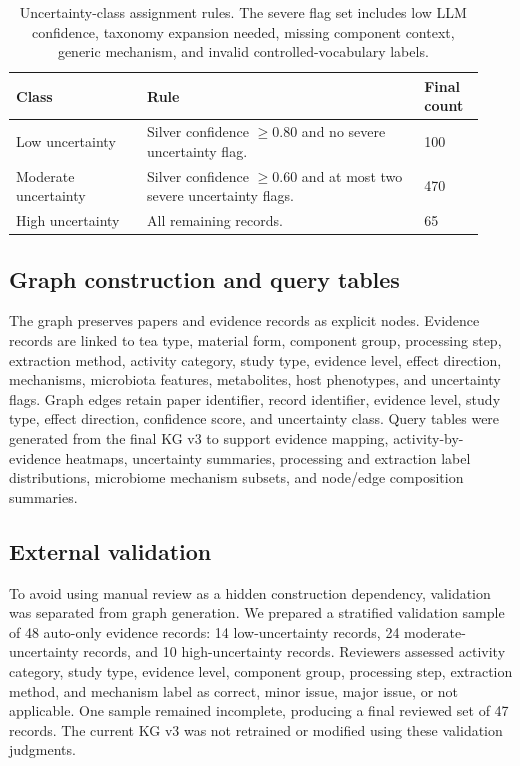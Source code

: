 \documentclass[11pt]{article}
\begin{document}
\begin{table}[t]
\centering
\small
\caption{Uncertainty-class assignment rules. The severe flag set includes low LLM confidence, taxonomy expansion needed, missing component context, generic mechanism, and invalid controlled-vocabulary labels.}
\label{tab:uncertainty_classes}
\begin{tabular}{p{0.26\linewidth}p{0.55\linewidth}p{0.12\linewidth}}
\toprule
Class & Rule & Final count \\
\midrule
Low uncertainty & Silver confidence $\geq 0.80$ and no severe uncertainty flag. & 100 \\
Moderate uncertainty & Silver confidence $\geq 0.60$ and at most two severe uncertainty flags. & 470 \\
High uncertainty & All remaining records. & 65 \\
\bottomrule
\end{tabular}
\end{table}

\subsection{Graph construction and query tables}

The graph preserves papers and evidence records as explicit nodes. Evidence records are linked to tea type, material form, component group, processing step, extraction method, activity category, study type, evidence level, effect direction, mechanisms, microbiota features, metabolites, host phenotypes, and uncertainty flags. Graph edges retain paper identifier, record identifier, evidence level, study type, effect direction, confidence score, and uncertainty class. Query tables were generated from the final KG v3 to support evidence mapping, activity-by-evidence heatmaps, uncertainty summaries, processing and extraction label distributions, microbiome mechanism subsets, and node/edge composition summaries.

\subsection{External validation}

To avoid using manual review as a hidden construction dependency, validation was separated from graph generation. We prepared a stratified validation sample of 48 auto-only evidence records: 14 low-uncertainty records, 24 moderate-uncertainty records, and 10 high-uncertainty records. Reviewers assessed activity category, study type, evidence level, component group, processing step, extraction method, and mechanism label as correct, minor issue, major issue, or not applicable. One sample remained incomplete, producing a final reviewed set of 47 records. The current KG v3 was not retrained or modified using these validation judgments.
\end{document}
